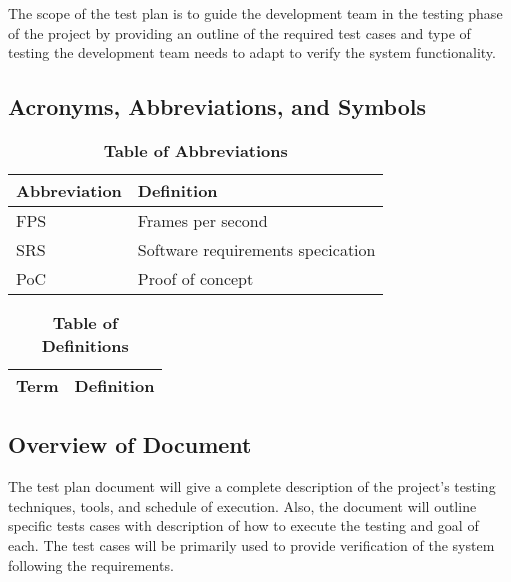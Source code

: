 \documentclass[12pt, titlepage]{article}
\begin{document}
The scope of the test plan is to guide the development team in the testing phase of the project by providing an outline of the required test cases and type of testing the development team needs to adapt to verify the system functionality.

\subsection{Acronyms, Abbreviations, and Symbols}
	
\begin{table}[hbp]
\caption{\textbf{Table of Abbreviations}} \label{TableAbbreviations}

\begin{tabularx}{\textwidth}{p{3cm}X}
\toprule
\textbf{Abbreviation} & \textbf{Definition} \\
\midrule
FPS & Frames per second\\
SRS & Software requirements specication\\
PoC & Proof of concept\\
\bottomrule
\end{tabularx}

\end{table}

\begin{table}[!htbp]
\caption{\textbf{Table of Definitions}} \label{TableDefinitions}

\begin{tabularx}{\textwidth}{p{3cm}X}
\toprule
\textbf{Term} & \textbf{Definition}\\
\midrule
\bottomrule
\end{tabularx}

\end{table}	

\subsection{Overview of Document}

The test plan document will give a complete description of the project's testing techniques, tools, and schedule of execution. Also, the document will outline specific tests cases with description of how to execute the testing and goal of each. The test cases will be primarily used to provide verification of the system following the requirements. 
\end{document}

